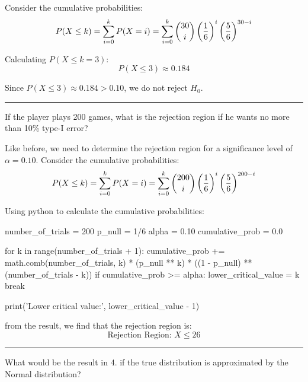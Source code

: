 \documentclass[a4paper, 10pt]{article}
\begin{document}
\begin{tosubmit}
Consider the cumulative probabilities:
\[ P(X \leq k) = \sum_{i=0}^{k} P(X = i) = \sum_{i=0}^{k} \binom{30}{i} \left( \frac{1}{6} \right)^i \left( \frac{5}{6} \right)^{30-i} \]

Calculating \( P(X \leq k = 3) \):
\[ P(X \leq 3) \approx 0.184 \]

Since \( P(X \leq 3) \approx 0.184 > 0.10 \), we do not reject \( H_0 \).

\vspace{3mm} \hrule \vspace{3mm}

\begin{subproblems}[resume]
    \item If the player plays 200 games, what is the rejection region if he wants no more than 10\% type-I error?
\end{subproblems}

\par\noindent\submitsolution
Like before, we need to determine the rejection region for a significance level of \( \alpha = 0.10 \).
Consider the cumulative probabilities:
\[ P(X \leq k) = \sum_{i=0}^{k} P(X = i) = \sum_{i=0}^{k} \binom{200}{i} \left( \frac{1}{6} \right)^i \left( \frac{5}{6} \right)^{200-i} \]

Using python to calculate the cumulative probabilities:
\begin{codingbox}
number_of_trials = 200 
p_null = 1/6
alpha = 0.10
cumulative_prob = 0.0

for k in range(number_of_trials + 1):
    cumulative_prob += math.comb(number_of_trials, k) * (p_null ** k) * ((1 - p_null) ** (number_of_trials - k))
    if cumulative_prob >= alpha:
        lower_critical_value = k
        break

print('Lower critical value:', lower_critical_value - 1)
\end{codingbox}

from the result, we find that the rejection region is:
\[ \boxed{ \text{Rejection Region: } X \leq 26 } \]

\vspace{3mm} \hrule \vspace{3mm}
\newpage

\begin{subproblems}[resume]
    \item What would be the result in 4. if the true distribution is approximated by the Normal distribution?
\end{subproblems}


\end{tosubmit}
\end{document}
